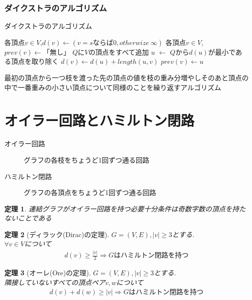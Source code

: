 \documentclass[a4j,10.5pt]{jarticle}
\theoremstyle{break}
\newtheorem{theo}{定理}[section]
\begin{document}
\subsubsection*{ダイクストラのアルゴリズム}

\begin{algorithm}
\caption{ダイクストラのアルゴリズム}
\begin{algorithmic}[1]
\STATE 各頂点$v \in V$,$d(v)\leftarrow(v = s ならば 0,otherwize \ \infty)$
\STATE 各頂点$v \in V$,$prev(v) \leftarrow 「無し」$
\STATE $Q$に$V$の頂点をすべて追加
\STATE $u$ $\leftarrow$ $Q$から$d(u)$が最小である頂点を取り除く
\STATE $d(v) \leftarrow d(u) + length(u,v)$
\STATE $prev(v) \leftarrow u$ 
\ENDIF
\ENDFOR
\ENDWHILE
\end{algorithmic}
\end{algorithm}

最初の頂点から一つ枝を渡った先の頂点の値を枝の重み分増やしそのあと頂点の中で一番重みの小さい頂点について同様のことを繰り返すアルゴリズム

\newpage

\section{オイラー回路とハミルトン閉路}
\begin{description}
\item[オイラー回路] グラフの各枝をちょうど1回ずつ通る回路
\item[ハミルトン閉路] グラフの各頂点をちょうど1回ずつ通る回路
\end{description}

\begin{theo}
連結グラフがオイラー回路を持つ必要十分条件は奇数字数の頂点を持たないことである
\end{theo}

\begin{theo}[ディラック(Dirac)の定理]
$G = (V,E),|v| \geq 3$とする.\\
$\forall v \in V$について
\begin{eqnarray*}
d(v) \geq \frac{|v|}{2} \Rightarrow Gはハミルトン閉路を持つ
\end{eqnarray*}
\end{theo}

\begin{theo}[オーレ(Ore)の定理]
$G = (V,E),|v| \geq 3$とする.\\
隣接していないすべての頂点ペア$v,w$について
\begin{eqnarray*}
d(v) + d(w) \geq |v| \Rightarrow Gはハミルトン閉路を持つ
\end{eqnarray*}
\end{theo}
\end{document}
